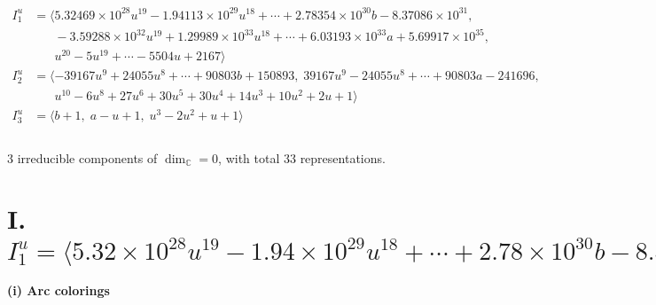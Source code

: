 \documentclass[1p]{elsarticle_modified}
\theoremstyle{definition}
\begin{document}
\begin{align*}
I^u_{1}&=\langle 
5.32469\times10^{28} u^{19}-1.94113\times10^{29} u^{18}+\cdots+2.78354\times10^{30} b-8.37086\times10^{31},\\
\phantom{I^u_{1}}&\phantom{= \langle  }-3.59288\times10^{32} u^{19}+1.29989\times10^{33} u^{18}+\cdots+6.03193\times10^{33} a+5.69917\times10^{35},\\
\phantom{I^u_{1}}&\phantom{= \langle  }u^{20}-5 u^{19}+\cdots-5504 u+2167\rangle \\
I^u_{2}&=\langle 
-39167 u^9+24055 u^8+\cdots+90803 b+150893,\;39167 u^9-24055 u^8+\cdots+90803 a-241696,\\
\phantom{I^u_{2}}&\phantom{= \langle  }u^{10}-6 u^8+27 u^6+30 u^5+30 u^4+14 u^3+10 u^2+2 u+1\rangle \\
I^u_{3}&=\langle 
b+1,\;a- u+1,\;u^3-2 u^2+u+1\rangle \\
\\
\end{align*}
\raggedright * 3 irreducible components of $\dim_{\mathbb{C}}=0$, with total 33 representations.\\
\newpage
\renewcommand{\arraystretch}{1}
\centering \section*{I. $I^u_{1}= \langle 5.32\times10^{28} u^{19}-1.94\times10^{29} u^{18}+\cdots+2.78\times10^{30} b-8.37\times10^{31},\;-3.59\times10^{32} u^{19}+1.30\times10^{33} u^{18}+\cdots+6.03\times10^{33} a+5.70\times10^{35},\;u^{20}-5 u^{19}+\cdots-5504 u+2167 \rangle$}
\flushleft \textbf{(i) Arc colorings}\\
\end{document}
